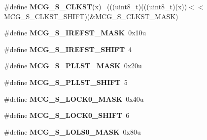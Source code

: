 \begin{DoxyCompactItemize}
\item 
\hypertarget{group___m_c_g___register___masks_gabb753abc57dbb658ff413c418d8b68c8}{}\#define {\bfseries M\+C\+G\+\_\+\+S\+\_\+\+C\+L\+K\+S\+T}(x)                                                  ~(((uint8\+\_\+t)(((uint8\+\_\+t)(x))$<$$<$M\+C\+G\+\_\+\+S\+\_\+\+C\+L\+K\+S\+T\+\_\+\+S\+H\+I\+F\+T))\&M\+C\+G\+\_\+\+S\+\_\+\+C\+L\+K\+S\+T\+\_\+\+M\+A\+S\+K)\label{group___m_c_g___register___masks_gabb753abc57dbb658ff413c418d8b68c8}

\item 
\hypertarget{group___m_c_g___register___masks_ga5bf822a90d9c1e67d5297420157e1dd0}{}\#define {\bfseries M\+C\+G\+\_\+\+S\+\_\+\+I\+R\+E\+F\+S\+T\+\_\+\+M\+A\+S\+K}~0x10u\label{group___m_c_g___register___masks_ga5bf822a90d9c1e67d5297420157e1dd0}

\item 
\hypertarget{group___m_c_g___register___masks_ga4a2727883c339845e709dacc0c2fd71a}{}\#define {\bfseries M\+C\+G\+\_\+\+S\+\_\+\+I\+R\+E\+F\+S\+T\+\_\+\+S\+H\+I\+F\+T}~4\label{group___m_c_g___register___masks_ga4a2727883c339845e709dacc0c2fd71a}

\item 
\hypertarget{group___m_c_g___register___masks_ga6f176d95968a5b7b1af67ae81734c854}{}\#define {\bfseries M\+C\+G\+\_\+\+S\+\_\+\+P\+L\+L\+S\+T\+\_\+\+M\+A\+S\+K}~0x20u\label{group___m_c_g___register___masks_ga6f176d95968a5b7b1af67ae81734c854}

\item 
\hypertarget{group___m_c_g___register___masks_gafddddab311f8f0cb58e7b7941f6d9a8d}{}\#define {\bfseries M\+C\+G\+\_\+\+S\+\_\+\+P\+L\+L\+S\+T\+\_\+\+S\+H\+I\+F\+T}~5\label{group___m_c_g___register___masks_gafddddab311f8f0cb58e7b7941f6d9a8d}

\item 
\hypertarget{group___m_c_g___register___masks_ga6cb486757d45c5211baa3b130e720b97}{}\#define {\bfseries M\+C\+G\+\_\+\+S\+\_\+\+L\+O\+C\+K0\+\_\+\+M\+A\+S\+K}~0x40u\label{group___m_c_g___register___masks_ga6cb486757d45c5211baa3b130e720b97}

\item 
\hypertarget{group___m_c_g___register___masks_ga5022e367019ecb07d0afbc3279e60b02}{}\#define {\bfseries M\+C\+G\+\_\+\+S\+\_\+\+L\+O\+C\+K0\+\_\+\+S\+H\+I\+F\+T}~6\label{group___m_c_g___register___masks_ga5022e367019ecb07d0afbc3279e60b02}

\item 
\hypertarget{group___m_c_g___register___masks_gae5967720d747b4d6f9fa748c94570c6d}{}\#define {\bfseries M\+C\+G\+\_\+\+S\+\_\+\+L\+O\+L\+S0\+\_\+\+M\+A\+S\+K}~0x80u\label{group___m_c_g___register___masks_gae5967720d747b4d6f9fa748c94570c6d}


\end{DoxyCompactItemize}
